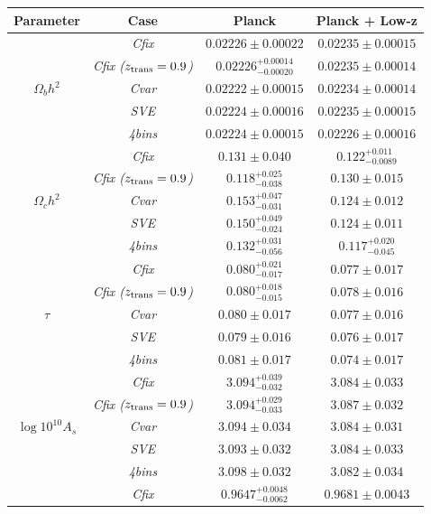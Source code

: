 \documentclass[a4paper,fleqn,usenatbib]{mnras}
\begin{document}
\begin{table}
\centering
\begin{tabular}{|c|c|c|c|}
\hline
    Parameter  & Case & Planck & Planck + Low-z\\
\hline
\hline
 & \textit{Cfix} & $0.02226\pm 0.00022$ & $0.02235\pm 0.00015$  \\
 & \textit{Cfix ($z_{\rm trans} = 0.9$)} & $0.02226^{+0.00014}_{-0.00020}$ & $0.02235\pm 0.00014$\\
$\Omega_b h^2$ & \textit{Cvar} & $0.02222\pm 0.00015 $ & $0.02234\pm 0.00014$  \\
 & \textit{SVE} & $0.02224\pm 0.00016$ & $0.02235\pm 0.00015$  \\
 & \textit{4bins} & $0.02224\pm 0.00015$ & $0.02226\pm 0.00016$  \\
\hline
 & \textit{Cfix} & $0.131\pm 0.040 $ & $0.122^{+0.011}_{-0.0089}$  \\
 & \textit{Cfix ($z_{\rm trans} = 0.9$)} & $0.118^{+0.025}_{-0.038}$ & $0.130\pm 0.015$\\
$\Omega_c h^2$ & \textit{Cvar} & $0.153^{+0.047}_{-0.031}$ & $0.124\pm 0.012$  \\
 & \textit{SVE} & $0.150^{+0.049}_{-0.024}$ & $0.124\pm 0.011$  \\
 & \textit{4bins} & $0.132^{+0.031}_{-0.056}$ & $0.117^{+0.020}_{-0.045}$  \\
\hline
 & \textit{Cfix} & $0.080^{+0.021}_{-0.017}$ & $0.077\pm 0.017$  \\
 & \textit{Cfix ($z_{\rm trans} = 0.9$)} & $0.080^{+0.018}_{-0.015}$ & $0.078\pm 0.016$\\
$\tau$ & \textit{Cvar} & $0.080\pm 0.017$ & $0.077\pm 0.016$  \\
 & \textit{SVE} & $0.079\pm 0.016$ & $0.076\pm 0.017$  \\
 & \textit{4bins} & $0.081\pm 0.017$ & $0.074\pm 0.017$  \\
\hline
 & \textit{Cfix} & $3.094^{+0.039}_{-0.032} $ & $3.084\pm 0.033 $  \\
 & \textit{Cfix ($z_{\rm trans} = 0.9$)} & $3.094^{+0.029}_{-0.033}$ & $3.087\pm 0.032$\\
$\log{10^{10}A_s}$ & \textit{Cvar} & $3.094\pm 0.034$ & $3.084\pm 0.031$  \\
 & \textit{SVE} & $3.093\pm 0.032$ & $3.084\pm 0.033$  \\
 & \textit{4bins} & $3.098\pm 0.032$ & $3.082\pm 0.034$  \\
\hline
 & \textit{Cfix} & $0.9647^{+0.0048}_{-0.0062}$ & $0.9681\pm 0.0043$  \\

\end{tabular}
\end{table}
\end{document}
